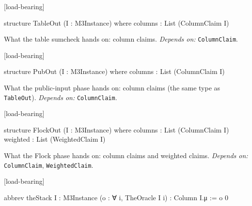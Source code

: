 \par\medskip\noindent\textbf{}\hfill\textsf{\small [load-bearing]}\par\nopagebreak

\begin{leancode}
structure TableOut (I : M3Instance) where
  columns : List (ColumnClaim I)
\end{leancode}


What the table sumcheck hands on: column claims. \emph{Depends on:} \texttt{ColumnClaim}.

\par\medskip\noindent\textbf{}\hfill\textsf{\small [load-bearing]}\par\nopagebreak

\begin{leancode}
structure PubOut (I : M3Instance) where
  columns : List (ColumnClaim I)
\end{leancode}


What the public-input phase hands on: column claims (the same type as \texttt{TableOut}). \emph{Depends on:} \texttt{ColumnClaim}.

\par\medskip\noindent\textbf{}\hfill\textsf{\small [load-bearing]}\par\nopagebreak

\begin{leancode}
structure FlockOut (I : M3Instance) where
  columns : List (ColumnClaim I)
  weighted : List (WeightedClaim I)
\end{leancode}


What the Flock phase hands on: column claims and weighted claims. \emph{Depends on:} \texttt{ColumnClaim}, \texttt{WeightedClaim}.

\par\medskip\noindent\textbf{}\hfill\textsf{\small [load-bearing]}\par\nopagebreak

\begin{leancode}
abbrev theStack {I : M3Instance} (o : ∀ i, TheOracle I i) : Column I.μ := o 0
\end{leancode}

